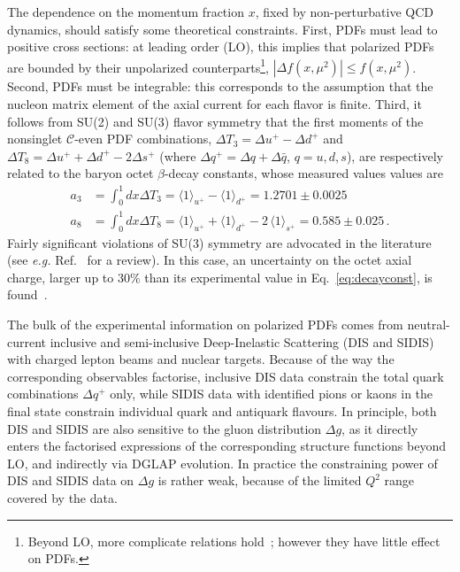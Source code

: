 The dependence on the momentum fraction $x$, fixed by non-perturbative QCD 
dynamics, should satisfy some theoretical constraints.
%
First, PDFs must lead to positive cross sections: 
at leading order (LO), this implies that polarized 
PDFs are bounded by their unpolarized counterparts\footnote{Beyond LO, more 
complicate relations hold~\cite{Altarelli:1998gn}; however they have little
effect on PDFs.}, $|\Delta f(x,\mu^2)|\leq f(x,\mu^2)$.
%
Second, PDFs must be integrable: this corresponds to the assumption 
that the nucleon matrix element of the axial current for each flavor is finite.
%
Third, it follows from SU(2) and SU(3) flavor symmetry that 
the first moments of the nonsinglet $\mathcal{C}$-even PDF combinations,
$\Delta T_3=\Delta u^+ -\Delta d^+$ and 
$\Delta T_8 = \Delta u^+ +\Delta d^+ -2\Delta s^+$ 
(where $\Delta q^+=\Delta q+\Delta\bar{q}$, $q=u,d,s$), are respectively
related to the baryon octet $\beta$-decay constants, whose 
measured values values are~\cite{Olive:2016xmw}
\begin{align}
 a_3
 & =
 \int_0^1 dx \Delta T_3 
 = \langle 1\rangle_{u^+} - \langle 1\rangle_{d^+}  = 1.2701 \pm 0.0025\\
 a_8
 & =
 \int_0^1 dx \Delta T_8 
 = \langle 1 \rangle_{u^+} + \langle 1 \rangle_{d^+} -2\,\langle 1 \rangle_{s^+} 
 =0.585  \pm 0.025
 \,\mbox{.}
\label{eq:decayconst}
\end{align}
%
Fairly significant violations of SU(3) symmetry are advocated
in the literature (see {\it e.g.} Ref.~\cite{Cabibbo:2003cu} for a review). 
%
In this case, an uncertainty on the octet axial charge, 
larger up to $30\%$ than its experimental value in Eq.~\eqref{eq:decayconst}, 
is found~\cite{FloresMendieta:1998ii}. 

The bulk of the experimental information on polarized PDFs comes from 
neutral-current inclusive and semi-inclusive Deep-Inelastic Scattering 
(DIS and SIDIS) with charged lepton beams and nuclear targets. 
%
Because of the way the corresponding observables factorise, inclusive DIS 
data constrain the total quark combinations $\Delta q^+$ only, 
while SIDIS data with identified pions or kaons in the final state 
constrain individual quark and antiquark flavours. 
%
In principle, both DIS and SIDIS are also sensitive to the gluon 
distribution $\Delta g$, as it directly enters the factorised expressions of
the corresponding structure functions beyond LO, and indirectly via DGLAP 
evolution.
%
In practice the constraining power of DIS and SIDIS data on $\Delta g$ is 
rather weak, because of the limited $Q^2$ range covered by the data. 

